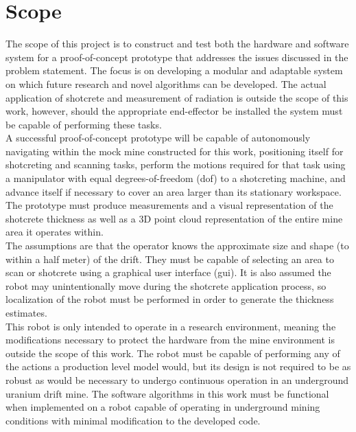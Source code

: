 \section{Scope}
\label{sec:scope}

The scope of this project is to construct and test both the hardware and software system for a proof-of-concept prototype that addresses the issues discussed in the problem statement. The focus is on developing a modular and adaptable system on which future research and novel algorithms can be developed. The actual application of shotcrete and measurement of radiation is outside the scope of this work, however, should the appropriate end-effector be installed the system must be capable of performing these tasks.\\

A successful proof-of-concept prototype will be capable of autonomously navigating within the mock mine constructed for this work, positioning itself for shotcreting and scanning tasks, perform the motions required for that task using a manipulator with equal degrees-of-freedom (\acrshort{dof}) to a shotcreting machine, and advance itself if necessary to cover an area larger than its stationary workspace. The prototype must produce measurements and a visual representation of the shotcrete thickness as well as a 3D point cloud representation of the entire mine area it operates within.\\

The assumptions are that the operator knows the approximate size and shape (to within a half meter) of the drift. They must be capable of selecting an area to scan or shotcrete using a graphical user interface (\acrshort{gui}). It is also assumed the robot may unintentionally move during the shotcrete application process, so localization of the robot must be performed in order to generate the thickness estimates.\\

This robot is only intended to operate in a research environment, meaning the modifications necessary to protect the hardware from the mine environment is outside the scope of this work. The robot must be capable of performing any of the actions a production level model would, but its design is not required to be as robust as would be necessary to undergo continuous operation in an underground uranium drift mine. The software algorithms in this work must be functional when implemented on a robot capable of operating in underground mining conditions with minimal modification to the developed code.\\


